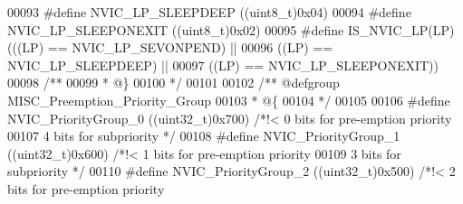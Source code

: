 \begin{DoxyCode}
00093 \textcolor{preprocessor}{#}\textcolor{preprocessor}{define} \textcolor{preprocessor}{NVIC\_LP\_SLEEPDEEP}            \textcolor{preprocessor}{(}\textcolor{preprocessor}{(}\textcolor{preprocessor}{uint8\_t}\textcolor{preprocessor}{)}0x04\textcolor{preprocessor}{)}
00094 \textcolor{preprocessor}{#}\textcolor{preprocessor}{define} \textcolor{preprocessor}{NVIC\_LP\_SLEEPONEXIT}          \textcolor{preprocessor}{(}\textcolor{preprocessor}{(}\textcolor{preprocessor}{uint8\_t}\textcolor{preprocessor}{)}0x02\textcolor{preprocessor}{)}
00095 \textcolor{preprocessor}{#}\textcolor{preprocessor}{define} \textcolor{preprocessor}{IS\_NVIC\_LP}\textcolor{preprocessor}{(}\textcolor{preprocessor}{LP}\textcolor{preprocessor}{)} \textcolor{preprocessor}{(}\textcolor{preprocessor}{(}\textcolor{preprocessor}{(}\textcolor{preprocessor}{LP}\textcolor{preprocessor}{)} \textcolor{preprocessor}{==} NVIC_LP_SEVONPEND\textcolor{preprocessor}{)} \textcolor{preprocessor}{||}
00096                         \textcolor{preprocessor}{(}\textcolor{preprocessor}{(}\textcolor{preprocessor}{LP}\textcolor{preprocessor}{)} \textcolor{preprocessor}{==} NVIC_LP_SLEEPDEEP\textcolor{preprocessor}{)} \textcolor{preprocessor}{||}
00097                         \textcolor{preprocessor}{(}\textcolor{preprocessor}{(}\textcolor{preprocessor}{LP}\textcolor{preprocessor}{)} \textcolor{preprocessor}{==} NVIC_LP_SLEEPONEXIT\textcolor{preprocessor}{)}\textcolor{preprocessor}{)}
00098 \textcolor{comment}{/**}
00099 \textcolor{comment}{  * @\}}
00100 \textcolor{comment}{  */}
00101 
00102 \textcolor{comment}{/** @defgroup MISC\_Preemption\_Priority\_Group }
00103 \textcolor{comment}{  * @\{}
00104 \textcolor{comment}{  */}
00105 
00106 \textcolor{preprocessor}{#}\textcolor{preprocessor}{define} \textcolor{preprocessor}{NVIC\_PriorityGroup\_0}         \textcolor{preprocessor}{(}\textcolor{preprocessor}{(}\textcolor{preprocessor}{uint32\_t}\textcolor{preprocessor}{)}0x700\textcolor{preprocessor}{)} \textcolor{comment}{/*!< 0 bits for pre-emption priority}
00107 \textcolor{comment}{                                                            4 bits for subpriority */}
00108 \textcolor{preprocessor}{#}\textcolor{preprocessor}{define} \textcolor{preprocessor}{NVIC\_PriorityGroup\_1}         \textcolor{preprocessor}{(}\textcolor{preprocessor}{(}\textcolor{preprocessor}{uint32\_t}\textcolor{preprocessor}{)}0x600\textcolor{preprocessor}{)} \textcolor{comment}{/*!< 1 bits for pre-emption priority}
00109 \textcolor{comment}{                                                            3 bits for subpriority */}
00110 \textcolor{preprocessor}{#}\textcolor{preprocessor}{define} \textcolor{preprocessor}{NVIC\_PriorityGroup\_2}         \textcolor{preprocessor}{(}\textcolor{preprocessor}{(}\textcolor{preprocessor}{uint32\_t}\textcolor{preprocessor}{)}0x500\textcolor{preprocessor}{)} \textcolor{comment}{/*!< 2 bits for pre-emption priority}

\end{DoxyCode}
